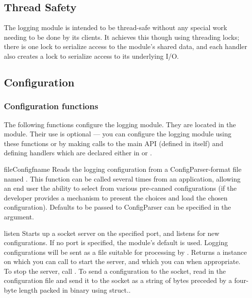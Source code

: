 \subsection{Thread Safety}

The logging module is intended to be thread-safe without any special work
needing to be done by its clients. It achieves this though using threading
locks; there is one lock to serialize access to the module's shared data,
and each handler also creates a lock to serialize access to its underlying
I/O.

\subsection{Configuration}


\subsubsection{Configuration functions%
               \label{logging-config-api}}

The following functions configure the logging module. They are located in the
 module.  Their use is optional --- you can configure
the logging module using these functions or by making calls to the
main API (defined in  itself) and defining handlers
which are declared either in  or
.

\begin{funcdesc}{fileConfig}{fname}
Reads the logging configuration from a ConfigParser-format file named
. This function can be called several times from an application,
allowing an end user the ability to select from various pre-canned
configurations (if the developer provides a mechanism to present the
choices and load the chosen configuration). Defaults to be passed to
ConfigParser can be specified in the  argument.
\end{funcdesc}

\begin{funcdesc}{listen}{}
Starts up a socket server on the specified port, and listens for new
configurations. If no port is specified, the module's default
 is used. Logging configurations
will be sent as a file suitable for processing by .
Returns a  instance on which you can call 
to start the server, and which you can  when appropriate.
To stop the server, call . To send a configuration
to the socket, read in the configuration file and send it to the socket
as a string of bytes preceded by a four-byte length packed in binary using
struct..
\end{funcdesc}

